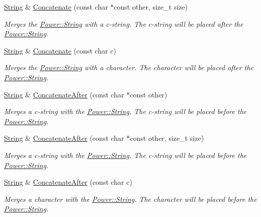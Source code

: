 \begin{DoxyCompactItemize}
\hyperlink{class_power_1_1_string}{String} \& \hyperlink{class_power_1_1_string_a180f61ef4e566993096eefaad01e56c1}{Concatenate} (const char $\ast$const other, size\+\_\+t size)
\begin{DoxyCompactList}\small\item\em Merges the \hyperlink{class_power_1_1_string}{Power\+::\+String} with a c-\/string. The c-\/string will be placed after the \hyperlink{class_power_1_1_string}{Power\+::\+String}. \end{DoxyCompactList}\item 
\hyperlink{class_power_1_1_string}{String} \& \hyperlink{class_power_1_1_string_a27c784f6b30c2ca3504cb217a3f3107a}{Concatenate} (const char c)
\begin{DoxyCompactList}\small\item\em Merges the \hyperlink{class_power_1_1_string}{Power\+::\+String} with a character. The character will be placed after the \hyperlink{class_power_1_1_string}{Power\+::\+String}. \end{DoxyCompactList}\item 
\hyperlink{class_power_1_1_string}{String} \& \hyperlink{class_power_1_1_string_a107898ce266986aba29ec9464539a8f8}{Concatenate\+After} (const char $\ast$const other)
\begin{DoxyCompactList}\small\item\em Merges a c-\/string with the \hyperlink{class_power_1_1_string}{Power\+::\+String}. The c-\/string will be placed before the \hyperlink{class_power_1_1_string}{Power\+::\+String}. \end{DoxyCompactList}\item 
\hyperlink{class_power_1_1_string}{String} \& \hyperlink{class_power_1_1_string_aa737e905780b2712166e9c2decbc4f38}{Concatenate\+After} (const char $\ast$const other, size\+\_\+t size)
\begin{DoxyCompactList}\small\item\em Merges a c-\/string with the \hyperlink{class_power_1_1_string}{Power\+::\+String}. The c-\/string will be placed before the \hyperlink{class_power_1_1_string}{Power\+::\+String}. \end{DoxyCompactList}\item 
\hyperlink{class_power_1_1_string}{String} \& \hyperlink{class_power_1_1_string_abd905989e4b22a1e203e5aec05eec828}{Concatenate\+After} (const char c)
\begin{DoxyCompactList}\small\item\em Merges a character with the \hyperlink{class_power_1_1_string}{Power\+::\+String}. The character will be placed before the \hyperlink{class_power_1_1_string}{Power\+::\+String}. \end{DoxyCompactList}\item 

\end{DoxyCompactItemize}
